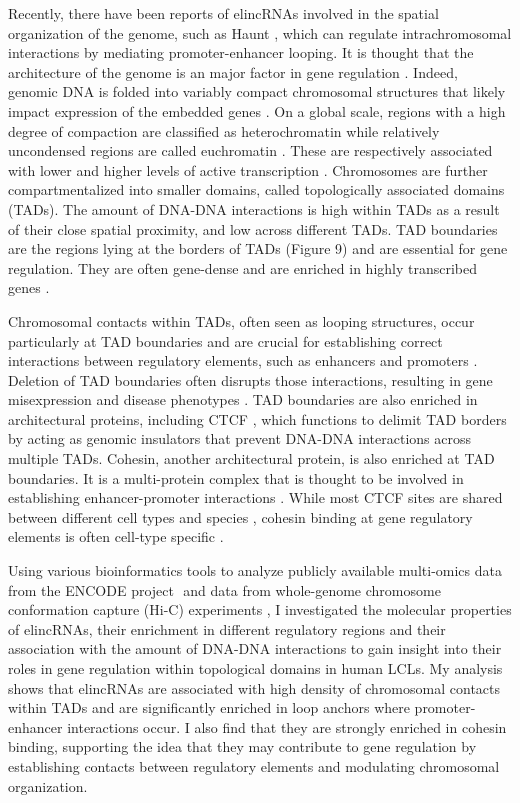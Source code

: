 \documentclass[11pt,a4paper]{report}
\begin{document}
Recently, there have been reports of elincRNAs involved in the spatial organization of the genome, such as Haunt \cite{Yin2015}⁠⁠, which can regulate intrachromosomal interactions by mediating promoter-enhancer looping.
It is thought that the architecture of the genome is an major factor in gene regulation \cite{Engreitz2016}⁠. Indeed, genomic DNA is folded into variably compact chromosomal structures that likely impact expression of the embedded genes \cite{Gorkin2014}⁠. On a global scale, regions with a high degree of compaction are classified as heterochromatin while relatively uncondensed regions are called euchromatin \cite{Passarge1979}. These are respectively associated with lower and higher levels of active transcription \cite{Tamaru2010}⁠. Chromosomes are further compartmentalized into smaller domains, called topologically associated domains (TADs). The amount of DNA-DNA interactions is high within TADs as a result of their close spatial proximity, and low across different TADs. TAD boundaries are the regions lying at the borders of TADs (Figure 9) and are essential for gene regulation. They are often gene-dense and are enriched in  highly transcribed genes \cite{Ong2014}⁠. 


Chromosomal contacts within TADs, often seen as looping structures, occur  particularly at TAD boundaries and are crucial for establishing correct  interactions between regulatory elements, such as enhancers and promoters \cite{Gorkin2014}⁠. Deletion of TAD boundaries often disrupts those interactions, resulting in gene misexpression and disease phenotypes \cite{Lupianez2016}⁠. TAD boundaries are also enriched in architectural proteins, including CTCF \cite{Pope2014}⁠, which functions to delimit TAD borders by acting as genomic insulators that prevent DNA-DNA interactions across multiple TADs. Cohesin, another architectural protein, is also enriched at TAD boundaries. It is a multi-protein complex that is thought to be involved in establishing enhancer-promoter interactions \cite{Ji2016}⁠. While most CTCF sites are shared between different cell types and species \cite{Ji2016}⁠, cohesin binding at gene regulatory elements is often cell-type specific \cite{Hadjur2009}⁠.

Using various bioinformatics tools to analyze publicly available multi-omics data from the ENCODE project \cite{ENCODEProject2012}⁠ and data from whole-genome chromosome conformation capture (Hi-C) experiments \cite{Rao2014}⁠, I investigated the molecular properties of elincRNAs, their enrichment in different regulatory regions and their association with the amount of DNA-DNA interactions to gain insight into their roles in gene regulation within topological domains in human LCLs. My analysis shows that elincRNAs are associated with high density of chromosomal contacts within TADs and are significantly enriched in loop anchors where promoter-enhancer interactions occur. I also find that they are strongly enriched in cohesin binding, supporting the idea that they may contribute to gene regulation by establishing contacts between regulatory elements and modulating chromosomal organization.
\end{document}
